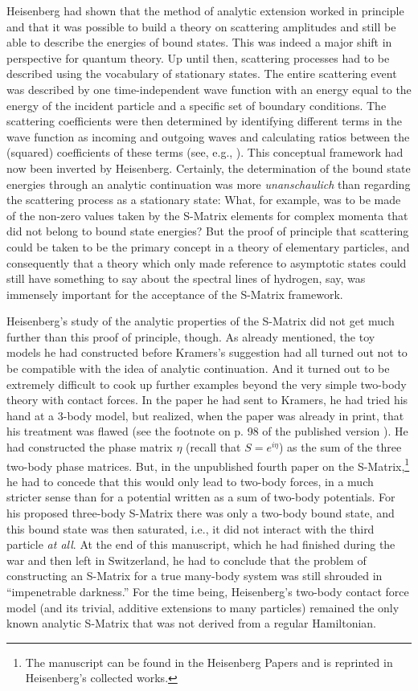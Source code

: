 \documentclass[12pt,a4paper]{article}
\begin{document}
Heisenberg had shown that the method of analytic extension worked in principle and that it was possible to build a theory on scattering amplitudes and still be able to describe the energies of bound states. This was indeed a major shift in perspective for quantum theory. Up until then, scattering processes had to be described using the vocabulary of stationary states. The entire scattering event was described by one time-independent wave function with an energy equal to the energy of the incident particle and a specific set of boundary conditions. The scattering coefficients were then determined by identifying different terms in the wave function as incoming and outgoing waves and calculating ratios between the (squared) coefficients of these terms (see, e.g., \citep[chapter IX]{dirac_1935_the-principles}). This conceptual framework had now been inverted by Heisenberg. Certainly, the determination of the bound state energies through an analytic continuation was more \emph{unanschaulich} than regarding the scattering process as a stationary state: What, for example, was to be made of the non-zero values taken by the S-Matrix elements for complex momenta that did not belong to bound state energies? But the proof of principle that scattering could be taken to be the primary concept in a theory of elementary particles, and consequently that a theory which only made reference to asymptotic states could still have something to say about the spectral lines of hydrogen, say, was immensely important for the acceptance of the S-Matrix framework.

Heisenberg's study of the analytic properties of the S-Matrix did not get much further than this proof of principle, though. As already mentioned, the toy models he had constructed before Kramers's suggestion had all turned out not to be compatible with the idea of analytic continuation. And it turned out to be extremely difficult to cook up further examples beyond the very simple two-body theory with contact forces. In the paper he had sent to Kramers, he had tried his hand at a 3-body model, but realized, when the paper was already in print, that his treatment was flawed (see the footnote on p. 98 of the published version \citep{heisenberg_1944_die-beobachtbaren}). He had constructed the phase matrix $\eta$ (recall that $S=e^{i \eta}$) as the sum of the three two-body phase matrices. But, in the unpublished fourth paper on the S-Matrix,\footnote{The manuscript can be found in the Heisenberg Papers and is reprinted in Heisenberg's collected works.} he had to concede that this would only lead to two-body forces, in a much stricter sense than for a potential written as a sum of two-body potentials. For his proposed three-body S-Matrix there was only a two-body bound state, and this bound state was then saturated, i.e., it did not interact with the third particle \emph{at all}. At the end of this manuscript, which he had finished during the war and then left in Switzerland, he had to conclude that the problem of constructing an S-Matrix for a true many-body system was still shrouded in ``impenetrable darkness.'' For the time being, Heisenberg's two-body contact force model (and its trivial, additive extensions to many particles) remained the only known analytic S-Matrix that was not derived from a regular Hamiltonian.
\end{document}
